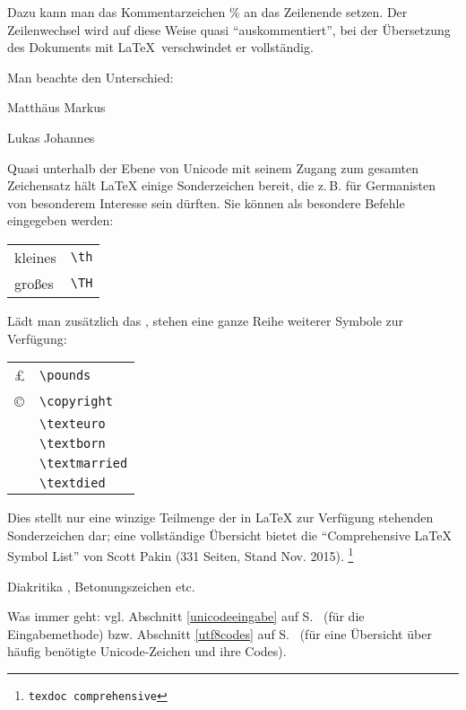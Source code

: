 Dazu kann man das Kommentarzeichen \% an das Zeilenende setzen. Der Zeilenwechsel wird auf diese 
Weise quasi \enquote{auskommentiert}, bei der Übersetzung des Dokuments mit \LaTeX\
verschwindet er vollständig.

Man beachte den Unterschied:

\begin{lfgwexample}{}
 Matthäus
 Markus
 
 Lukas%
 Johannes
\end{lfgwexample}



Quasi unterhalb der Ebene von Unicode mit seinem Zugang zum gesamten Zeichensatz hält 
\LaTeX{} einige Sonderzeichen bereit, die z.\,B. für Germanisten von besonderem Interesse
sein dürften. Sie können als besondere Befehle eingegeben werden:

\begin{tabular}{ll}
 kleines \th & 	\lstinline/\th/ \\
 großes \TH & 	\lstinline/\TH/ \\
\end{tabular}

Lädt man zusätzlich das , stehen eine ganze Reihe weiterer Symbole
zur Verfügung:

\begin{tabular}{ll}
 \pounds & 	\lstinline/\pounds/ \\
 \copyright & 	\lstinline/\copyright/ \\
 \texteuro & 	\lstinline/\texteuro/ \\
 \textborn & 	\lstinline/\textborn/ \\
 \textmarried & 	\lstinline/\textmarried/ \\
 \textdied & 	\lstinline/\textdied/ \\
 \end{tabular}
 
Dies stellt nur eine winzige Teilmenge der in \LaTeX{} zur Verfügung stehenden Sonderzeichen dar;
eine vollständige Übersicht bietet die \enquote{Comprehensive \LaTeX{} Symbol List} von
Scott Pakin (331 Seiten, Stand Nov. 2015).
\footnote{\lstinline/texdoc comprehensive/}



Diakritika ,
Betonungszeichen etc.



Was immer geht: 
vgl. Abschnitt \ref{unicodeeingabe} auf S.~\pageref{unicodeeingabe} 
(für die Eingabemethode)
bzw. Abschnitt \ref{utf8codes} auf S.~\pageref{utf8codes} 
(für eine Übersicht über häufig benötigte Unicode-Zeichen und ihre Codes).


